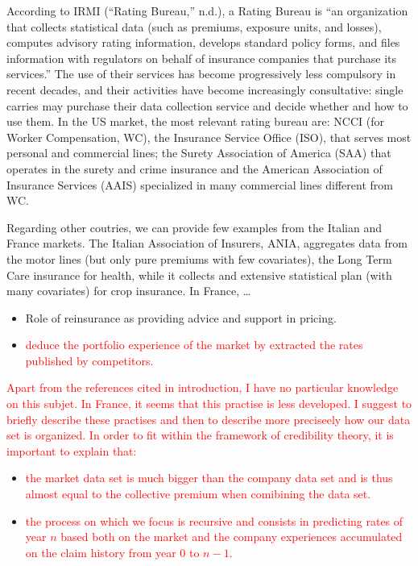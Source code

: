 \documentclass[
]{article}
\providecommand{\tightlist}{%
  \setlength{\itemsep}{0pt}\setlength{\parskip}{0pt}}
\begin{document}
According to IRMI ({``Rating Bureau,''} n.d.), a Rating Bureau is ``an
organization that collects statistical data (such as premiums, exposure
units, and losses), computes advisory rating information, develops
standard policy forms, and files information with regulators on behalf
of insurance companies that purchase its services.'' The use of their
services has become progressively less compulsory in recent decades, and
their activities have become increasingly consultative: single carries
may purchase their data collection service and decide whether and how to
use them. In the US market, the most relevant rating bureau are: NCCI
(for Worker Compensation, WC), the Insurance Service Office (ISO), that
serves most personal and commercial lines; the Surety Association of
America (SAA) that operates in the surety and crime insurance and the
American Association of Insurance Services (AAIS) specialized in many
commercial lines different from WC.

Regarding other coutries, we can provide few examples from the Italian
and France markets. The Italian Association of Insurers, ANIA,
aggregates data from the motor lines (but only pure premiums with few
covariates), the Long Term Care insurance for health, while it collects
and extensive statistical plan (with many covariates) for crop
insurance. In France, \ldots{}

\begin{itemize}
\tightlist
\item
  Role of reinsurance as providing advice and support in pricing.
\item
  \textcolor{red}{deduce the portfolio experience of the market by extracted the rates published by competitors.}
\end{itemize}

\textcolor{red}{Apart from the references cited in introduction, I have no particular knowledge on this subjet. In France, it seems that this practise is less developed. I suggest to briefly describe these practises and then to describe more preciseely how our data set is organized. In order to fit within the framework of credibility theory, it is important to explain that:}

\begin{itemize}
\tightlist
\item
  \textcolor{red}{the market data set is much bigger than the company data set and is thus almost equal to the collective premium when comibining the data set.}
\item
  \textcolor{red}{the process on which we focus is recursive and consists in predicting rates of year $n$ based both on the market and the company experiences accumulated on the claim history from year $0$ to $n-1$.}
\end{itemize}
\end{document}
